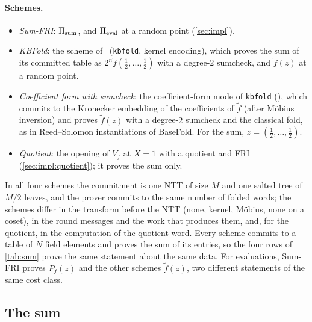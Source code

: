 \paragraph{Schemes.}
\begin{itemize}
  \item \emph{Sum-FRI}: $\Pi_{\mathrm{sum}}$, and $\Pi_{\mathrm{eval}}$ at a random point (\cref{sec:impl}).
  \item \emph{KBFold}: the scheme of~\cite{Mkh26} (\texttt{kbfold}, kernel encoding), which proves the sum of its committed table as $2^n \tilde f(\tfrac12, \dots, \tfrac12)$ with a degree-$2$ sumcheck, and $\tilde f(z)$ at a random point.
  \item \emph{Coefficient form with sumcheck}: the coefficient-form mode of \texttt{kbfold} (), which commits to the Kronecker embedding of the coefficients of $\tilde f$ (after M\"obius inversion) and proves $\tilde f(z)$ with a degree-$2$ sumcheck and the classical fold, as in Reed--Solomon instantiations of BaseFold. For the sum, $z = (\tfrac12, \dots, \tfrac12)$.
  \item \emph{Quotient}: the opening of $V_f$ at $X = 1$ with a quotient and FRI (\cref{sec:impl:quotient}); it proves the sum only.
\end{itemize}
In all four schemes the commitment is one NTT of size $M$ and one salted tree of $M/2$ leaves, and the prover commits to the same number of folded words; the schemes differ in the transform before the NTT (none, kernel, M\"obius, none on a coset), in the round messages and the work that produces them, and, for the quotient, in the computation of the quotient word.
Every scheme commits to a table of $N$ field elements and proves the sum of its entries, so the four rows of \cref{tab:sum} prove the same statement about the same data.
For evaluations, Sum-FRI proves $P_f(z)$ and the other schemes $\tilde f(z)$, two different statements of the same cost class.

\subsection{The sum}\label{sec:exp:sum}

